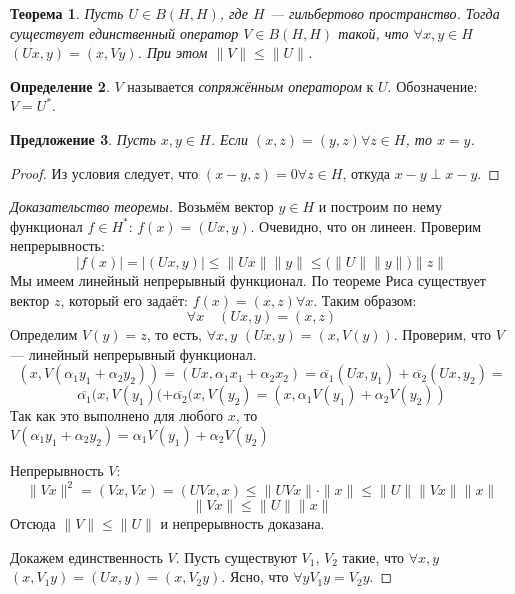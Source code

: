 \documentclass[11pt,openany,a4paper]{scrartcl}
\theoremstyle{plain}
\newtheorem{theorem}{Теорема}[section]
\newtheorem{proposition}[theorem]{Предложение}
\theoremstyle{definition}
\newtheorem{definition}[theorem]{Определение}
\newcommand\ol{\overline}
\begin{document}
\begin{theorem}
    Пусть $U \in B(H, H)$, где $H$ — гильбертово пространство. Тогда существует
    единственный оператор $V \in B(H, H)$ такой, что $\forall x,y \in H$
    $(Ux, y) = (x, Vy)$. При этом $\|V\| \leqslant \|U\|$.
\end{theorem}
\begin{definition}
    $V$ называется \emph{сопряжённым оператором} к $U$. Обозначение: $V = U^\ast$.
\end{definition}
\begin{proposition}
    Пусть $x, y \in H$. Если $(x, z) = (y, z) \forall z \in H$, то $x = y$.
\end{proposition}
\begin{proof}
    Из условия следует, что $(x - y, z) = 0 \forall z \in H$, откуда
    $x - y \perp x - y$.
\end{proof}
\begin{proof}[Доказательство теоремы]
    Возьмём вектор $y \in H$ и построим по нему функционал $f \in H^\ast$:
    $f(x) = (Ux, y)$. Очевидно, что он линеен. Проверим непрерывность:
    $$
    |f(x)| = |(Ux, y)| \leqslant \|Ux\|\|y\| \leqslant \big(\|U\|\|y\|\big)\|z\|
    $$
    Мы имеем линейный непрерывный функционал. По теореме Риса существует вектор
    $z$, который его задаёт: $f(x) = (x, z) \forall x$. Таким образом:
    $$
    \forall x\quad (Ux, y) = (x, z)
    $$
    Определим $V(y) = z$, то есть, $\forall x,y$ $(Ux, y) = (x, V(y))$.
    Проверим, что $V$ — линейный непрерывный функционал.
    $$
    (x, V(\alpha_1y_1 + \alpha_2y_2)) = (Ux, \alpha_1x_1 + \alpha_2x_2) =
    \ol{\alpha_1}(Ux, y_1) + \ol{\alpha_2}(Ux, y_2) =
    $$
    $$
    \ol{\alpha_1}(x, V(y_1)( + \ol{\alpha_2}(x, V(y_2) =
    (x, \alpha_1V(y_1) + \alpha_2V(y_2))
    $$
    Так как это выполнено для любого $x$, то $V(\alpha_1y_1 + \alpha_2y_2) =
    \alpha_1V(y_1) + \alpha_2V(y_2)$
    
    Непрерывность $V$:
    $$
    \|Vx\|^2 = (Vx, Vx) = (UVx, x) \leqslant \|UVx\|\cdot\|x\| \leqslant
    \|U\|\|Vx\|\|x\|
    $$
    $$
    \|Vx\| \leqslant \|U\|\|x\|
    $$
    Отсюда $\|V\| \leqslant \|U\|$ и непрерывность доказана.
    
    Докажем единственность $V$. Пусть существуют $V_1$, $V_2$ такие, что
    $\forall x,y$ $(x, V_1y) = (Ux, y) = (x, V_2y)$. Ясно, что $\forall y
    V_1y = V_2y$.
\end{proof}
\end{document}
